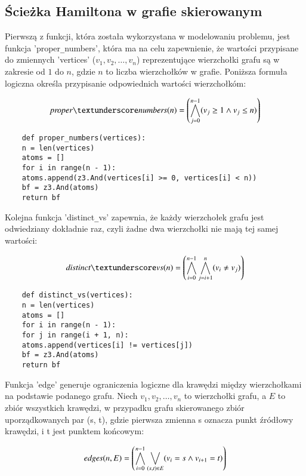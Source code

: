 \subsection{Ścieżka Hamiltona w grafie skierowanym}

Pierwszą z funkcji, która została wykorzystana w modelowaniu problemu, jest funkcja 'proper\verb|_|numbers', która ma na celu zapewnienie, że wartości przypisane do zmiennych 'vertices' ($v_1, v_2, …, v_n$) reprezentujące wierzchołki grafu są w zakresie od $1$ do $n$, gdzie $n$ to liczba wierzchołków w grafie. Poniższa formuła logiczna określa przypisanie odpowiednich wartości wierzchołkóm:

\begin{align*}
	\mli{proper\textunderscore numbers}(n) = \left( \bigwedge_{j=0}^{n-1} (v_j \geq 1 \land v_j \leq n) \right) 
\end{align*}

\begin{lstlisting}
	def proper_numbers(vertices):
	n = len(vertices)
	atoms = []
	for i in range(n - 1):
	atoms.append(z3.And(vertices[i] >= 0, vertices[i] < n))
	bf = z3.And(atoms)
	return bf
\end{lstlisting}
\vspace{1cm}

Kolejna funkcja 'distinct\verb|_|vs' zapewnia, że każdy wierzchołek grafu jest odwiedziany dokładnie raz, czyli żadne dwa wierzchołki nie mają tej samej wartości:

\begin{align*}
	\mli{distinct\textunderscore vs}(n) = \left( \bigwedge_{i=0}^{n-1} \bigwedge_{j=i+1}^{n} (v_i \neq v_j) \right)
\end{align*}

\begin{lstlisting}	
	def distinct_vs(vertices):
	n = len(vertices)
	atoms = []
	for i in range(n - 1):
	for j in range(i + 1, n):
	atoms.append(vertices[i] != vertices[j])
	bf = z3.And(atoms)
	return bf
\end{lstlisting}
\vspace{1cm}

Funkcja 'edge' generuje ograniczenia logiczne dla krawędzi między wierzchołkami na podstawie podanego grafu. Niech $v_1, v_2, …, v_n$ to wierzchołki grafu, a \(E\) to zbiór wszystkich krawędzi, w przypadku grafu skierowanego zbiór uporządkowanych par (s, t), gdzie pierwsza zmienna s oznacza punkt źródłowy krawędzi, i t jest punktem końcowym:

\begin{align*}
	\mathit{edges}(n, E) = \left( \bigwedge_{i=0}^{n-1} \bigvee_{(s,t) \in E} (v_i = s \land v_{i+1} = t) \right)
\end{align*}

